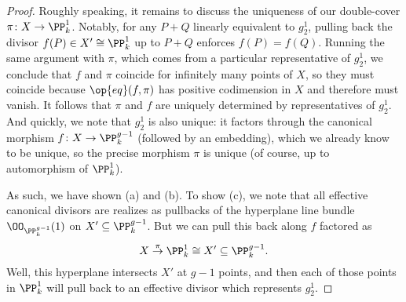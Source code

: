 \documentclass[../notes.tex]{subfiles}
\begin{document}
\begin{proof}
	Roughly speaking, it remains to discuss the uniqueness of our double-cover $\pi\colon X\to\PP^1_k$. Notably, for any $P+Q$ linearly equivalent to $g^1_2$, pulling back the divisor $f(P)\in X'\cong\PP^1_k$ up to $P+Q$ enforces $f(P)=f(Q)$. Running the same argument with $\pi$, which comes from a particular representative of $g^1_2$, we conclude that $f$ and $\pi$ coincide for infinitely many points of $X$, so they must coincide because $\op{eq}(f,\pi)$ has positive codimension in $X$ and therefore must vanish. It follows that $\pi$ and $f$ are uniquely determined by representatives of $g^1_2$. And quickly, we note that $g^1_2$ is also unique: it factors through the canonical morphism $f\colon X\to\PP^{g-1}_k$ (followed by an embedding), which we already know to be unique, so the precise morphism $\pi$ is unique (of course, up to automorphism of $\PP^1_k$).

	As such, we have shown (a) and (b). To show (c), we note that all effective canonical divisors are realizes as pullbacks of the hyperplane line bundle $\OO_{\PP^{g-1}_k}(1)$ on $X'\subseteq\PP^{g-1}_k$. But we can pull this back along $f$ factored as
	\[X\stackrel\pi\to\PP^1_k\cong X'\subseteq\PP^{g-1}_k.\]
	Well, this hyperplane intersects $X'$ at $g-1$ points, and then each of those points in $\PP^1_k$ will pull back to an effective divisor which represents $g^1_2$.
\end{proof}
\end{document}
